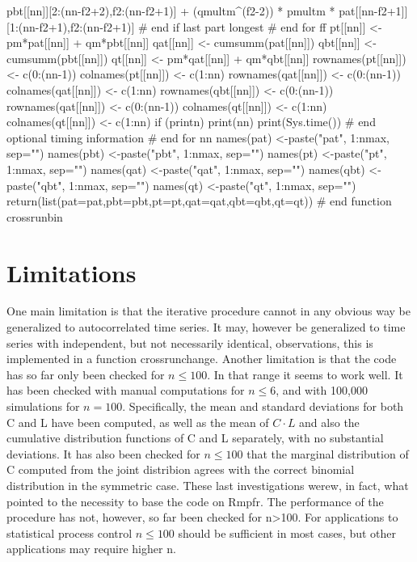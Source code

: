 \begin{example}
{{{{          pbt[[nn]][2:(nn-f2+2),f2:(nn-f2+1)] +
          (qmultm^(f2-2)) * pmultm * pat[[nn-f2+1]][1:(nn-f2+1),f2:(nn-f2+1)]
      } # end if last part longest
    } # end for ff
    pt[[nn]] <- pm*pat[[nn]] + qm*pbt[[nn]]
    qat[[nn]] <- cumsumm(pat[[nn]])
    qbt[[nn]] <- cumsumm(pbt[[nn]])
    qt[[nn]] <- pm*qat[[nn]] + qm*qbt[[nn]]
    rownames(pt[[nn]]) <- c(0:(nn-1))
    colnames(pt[[nn]]) <- c(1:nn)
    rownames(qat[[nn]]) <- c(0:(nn-1))
    colnames(qat[[nn]]) <- c(1:nn)
    rownames(qbt[[nn]]) <- c(0:(nn-1))
    rownames(qat[[nn]]) <- c(0:(nn-1))
    colnames(qt[[nn]]) <- c(1:nn)
    colnames(qt[[nn]]) <- c(1:nn)
    if (printn) {
      print(nn)
      print(Sys.time())
    } # end optional timing information
  } # end for nn
  names(pat) <-paste("pat", 1:nmax, sep="")
  names(pbt) <-paste("pbt", 1:nmax, sep="")
  names(pt) <-paste("pt", 1:nmax, sep="")
  names(qat) <-paste("qat", 1:nmax, sep="")
  names(qbt) <-paste("qbt", 1:nmax, sep="")
  names(qt) <-paste("qt", 1:nmax, sep="")
  return(list(pat=pat,pbt=pbt,pt=pt,qat=qat,qbt=qbt,qt=qt))
} # end function crossrunbin
\end{example}

\section{Limitations}

One main limitation is that the iterative procedure cannot in any obvious way be generalized to autocorrelated time series. It may, however be generalized to time series with independent, but not necessarily identical, observations, this is implemented in a function crossrunchange. Another limitation is that the code has so far only been checked for $n \leq 100$. In that range it seems to work well. It has been checked with manual computations for $n \leq 6$, and with 100,000 simulations for $n=100$. Specifically, the mean and standard deviations for both C and L have been computed, as well as the mean of $C \cdot L$ and also the cumulative distribution functions of C and L separately, with no substantial deviations. It has also been checked for $n \leq 100$ that the marginal distribution of C computed from the joint distribion agrees with the correct binomial distribution in the symmetric case. These last investigations werew, in fact, what pointed to the necessity to base the code on Rmpfr. The performance of the procedure has not, however, so far been checked for n>100. For applications to statistical process control $n \leq 100$ should be sufficient in most cases, but other applications may require higher n.

